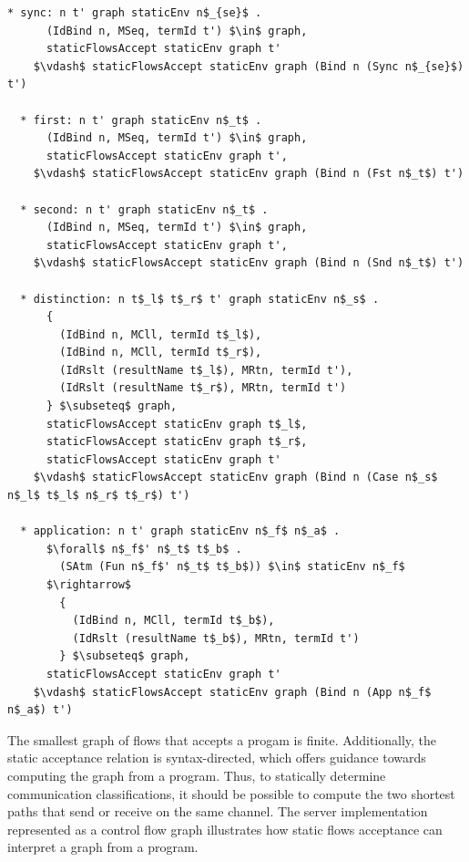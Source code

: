\documentclass[letterpaper, 11pt]{extarticle}
\begin{document}
\begin{lstlisting}[language=logic, mathescape]
  * sync: n t' graph staticEnv n$_{se}$ .
      (IdBind n, MSeq, termId t') $\in$ graph, 
      staticFlowsAccept staticEnv graph t'
    $\vdash$ staticFlowsAccept staticEnv graph (Bind n (Sync n$_{se}$) t')

  * first: n t' graph staticEnv n$_t$ .
      (IdBind n, MSeq, termId t') $\in$ graph, 
      staticFlowsAccept staticEnv graph t', 
    $\vdash$ staticFlowsAccept staticEnv graph (Bind n (Fst n$_t$) t')

  * second: n t' graph staticEnv n$_t$ .
      (IdBind n, MSeq, termId t') $\in$ graph, 
      staticFlowsAccept staticEnv graph t', 
    $\vdash$ staticFlowsAccept staticEnv graph (Bind n (Snd n$_t$) t')

  * distinction: n t$_l$ t$_r$ t' graph staticEnv n$_s$ .
      {
        (IdBind n, MCll, termId t$_l$),
        (IdBind n, MCll, termId t$_r$),
        (IdRslt (resultName t$_l$), MRtn, termId t'),
        (IdRslt (resultName t$_r$), MRtn, termId t')
      } $\subseteq$ graph, 
      staticFlowsAccept staticEnv graph t$_l$, 
      staticFlowsAccept staticEnv graph t$_r$,
      staticFlowsAccept staticEnv graph t'
    $\vdash$ staticFlowsAccept staticEnv graph (Bind n (Case n$_s$ n$_l$ t$_l$ n$_r$ t$_r$) t')

  * application: n t' graph staticEnv n$_f$ n$_a$ .
      $\forall$ n$_f$' n$_t$ t$_b$ . 
        (SAtm (Fun n$_f$' n$_t$ t$_b$)) $\in$ staticEnv n$_f$ 
      $\rightarrow$
        {
          (IdBind n, MCll, termId t$_b$),
          (IdRslt (resultName t$_b$), MRtn, termId t')
        } $\subseteq$ graph,
      staticFlowsAccept staticEnv graph t'
    $\vdash$ staticFlowsAccept staticEnv graph (Bind n (App n$_f$ n$_a$) t')
\end{lstlisting}

The smallest graph of flows that accepts a progam is finite. Additionally, the static
acceptance relation is syntax-directed, which offers guidance towards computing the graph
from a program. Thus, to statically determine communication classifications, it should
be possible to compute the two shortest paths that send or receive on the same channel. 
The server implementation represented as a control flow graph
illustrates how static flows acceptance can interpret a graph from a program.
\end{document}
